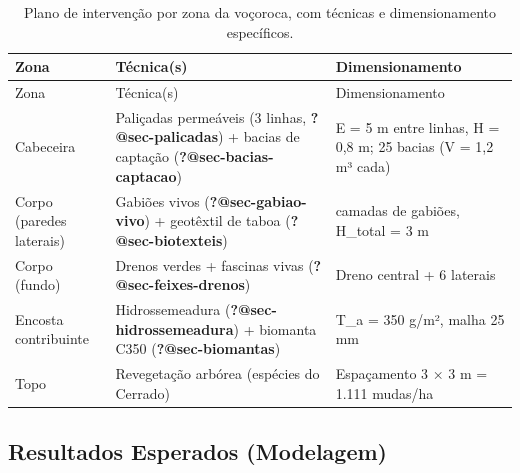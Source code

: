 \documentclass[
  portuguese,
  11pt,
  a4paper,
  open=any]{scrbook}
\begin{document}
\begin{longtable}[]{@{}
  >{\raggedright\arraybackslash}p{}
  >{\raggedright\arraybackslash}p{}
  >{\raggedright\arraybackslash}p{}@{}}
\caption{Plano de intervenção por zona da voçoroca, com técnicas e
dimensionamento
específicos.}\label{tbl-plano-intervencao}\tabularnewline
\toprule\noalign{}
\begin{minipage}[b]{\linewidth}\raggedright
Zona
\end{minipage} & \begin{minipage}[b]{\linewidth}\raggedright
Técnica(s)
\end{minipage} & \begin{minipage}[b]{\linewidth}\raggedright
Dimensionamento
\end{minipage} \\
\midrule\noalign{}
\endfirsthead
\toprule\noalign{}
\begin{minipage}[b]{\linewidth}\raggedright
Zona
\end{minipage} & \begin{minipage}[b]{\linewidth}\raggedright
Técnica(s)
\end{minipage} & \begin{minipage}[b]{\linewidth}\raggedright
Dimensionamento
\end{minipage} \\
\midrule\noalign{}
\endhead
\bottomrule\noalign{}
\endlastfoot
Cabeceira & Paliçadas permeáveis (3 linhas, \textbf{?@sec-palicadas}) +
bacias de captação (\textbf{?@sec-bacias-captacao}) & E = 5 m entre
linhas, H = 0,8 m; 25 bacias (V = 1,2 m³ cada) \\
Corpo (paredes laterais) & Gabiões vivos (\textbf{?@sec-gabiao-vivo}) +
geotêxtil de taboa (\textbf{?@sec-biotexteis}) & 3 camadas de gabiões,
H\_total = 3 m \\
Corpo (fundo) & Drenos verdes + fascinas vivas
(\textbf{?@sec-feixes-drenos}) & Dreno central + 6 laterais \\
Encosta contribuinte & Hidrossemeadura (\textbf{?@sec-hidrossemeadura})
+ biomanta C350 (\textbf{?@sec-biomantas}) & T\_a = 350 g/m², malha 25
mm \\
Topo & Revegetação arbórea (espécies do Cerrado) & Espaçamento 3 × 3 m =
1.111 mudas/ha \\
\end{longtable}

\subsection{Resultados Esperados
(Modelagem)}\label{resultados-esperados-modelagem}
\end{document}
